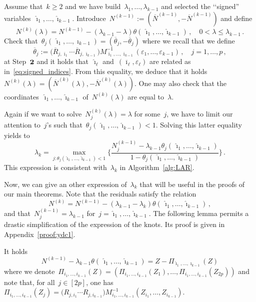 \documentclass[final,numbib]{imaiai}%
\numberwithin{equation}{section}
\def\eq{\begin{equation}}
\def\qe{\end{equation}}
\renewcommand{\bar}{\overline}
\renewcommand{\hat}{\widehat}
\newcommand{\<}{\langle}
\renewcommand{\>}{\rangle}
\newcommand{\1}{\mathds{1}}
\begin{document}
{Assume that~$k\geq2$ and we have build~$\lambda_1,\ldots,\lambda_{k-1}$ and selected the ‘‘signed'' variables~$\hat \imath_1, \ldots,\hat \imath_{k-1}$. Introduce~$ N^{(k-1)}:=(\bar N^{(k-1)},-\bar N^{(k-1)})$ and define
 \[
 N^{(k)}(\lambda)=N^{(k-1)}-(\lambda_{k-1}-\lambda) \theta(\,\hat \imath_1,\ldots, \hat \imath_{k-1})\,,\quad 0<\lambda\leq\lambda_{k-1}\,.
  \]
 Check that~$ \theta_j(\,\hat \imath_1,\ldots, \hat \imath_{k-1})=(\bar \theta_j,-\bar \theta_j)$ where we recall that we define 
 \[
      \bar \theta_j:=\big(\bar R_{j,\bar \imath_1} \cdots \bar R_{j,\bar \imath_{k-1}}  \big) M^{-1}_{\bar \imath_1,\ldots, \bar \imath_{k-1}} (\varepsilon_1,\ldots,\varepsilon_{k-1})\,,\quad j=1,\ldots,p\,,
      \]
      at Step~${\bf 2}$ and it holds that~$\hat \imath_\ell$ and~$(\bar \imath_\ell,\varepsilon_\ell)$ are related as in~\eqref{eq:signed_indices}. From this equality, we deduce that it holds~$N^{(k)}(\lambda)=(\bar N^{(k)}(\lambda),-\bar N^{(k)}(\lambda))$. One may also check that the coordinates~$\hat \imath_1,\ldots,\hat \imath_{k-1}$ of~$  N^{(k)}(\lambda)$  are equal to~$\lambda$.

Again  if we want to solve~$  N_j^{(k)}(\lambda) = \lambda %
$ for some~$j$, we have to limit our attention  to~$j$'s such that~$  \theta_j(\,\hat \imath_1,\ldots, \hat \imath_{k-1}) <1$. Solving this latter equality yields to
 \[
 \lambda_k=  \max_{j : \theta_j( \hat \imath_1, \ldots,\hat \imath_{k-1}) <1} 
 \bigg\{\frac{N^{(k-1)}_j -\lambda_{k-1} \theta_j(\,\hat \imath_1,\ldots,\hat \imath_{k-1})}{ 1-\theta_j(\,\hat \imath_1,\ldots,\hat \imath_{k-1})}
 \bigg\}
 \,.
 \]
 This expression is consistent with~$\lambda_k$ in Algorithm~\ref{alg:LAR}. 
 
 \newpage
 
 Now, we can give an other expression of~$\lambda_k$ that will be useful in the proofs of our main theorems. Note that the residuals satisfy the relation
 \eq
 \label{eq:value_nk}
N^{(k)}=N^{(k-1)}-(\lambda_{k-1}-\lambda_k) \theta(\,\hat \imath_1,\ldots, \hat \imath_{k-1})\,,
 \qe
 and that~$N^{(k-1)}_j = \lambda_{k-1}$ for~$j=\hat \imath_1,\ldots,\hat \imath_{k-1}$. The following lemma permits  a drastic simplification of the expression of the knots. Its proof is given in Appendix~\ref{proof:ydc1}.
 
    \begin{lemma}  \label{l:jm}
It holds 
  \[
 {N^{(k-1)} -\lambda_{k-1} \theta(\,\hat \imath_1,\ldots,\hat \imath_{k-1})}=Z - \Pi_{\hat \imath_1,\ldots,\hat \imath_{k-1}}  (Z)
  \]
where we denote~$\Pi_{ i_1,\ldots, i_{k-1}} (Z) = (\Pi_{ i_1,\ldots, i_{k-1}} (Z_1),\ldots,\Pi_{ i_1,\ldots, i_{k-1}} (Z_{2p}))$ and note that, for all~$j\in[2p]$, one has $
\Pi_{ i_1,\ldots, i_{k-1}} (Z_j) =  \big(R_{j,i_1} \cdots R_{j,i_{k-1}}  \big)M^{-1}_{i_1,\ldots, i_{k-1}}  
(Z_{i_1}, \ldots, Z_{i_{k-1}})$. 
\end{lemma}

}
\end{document}
